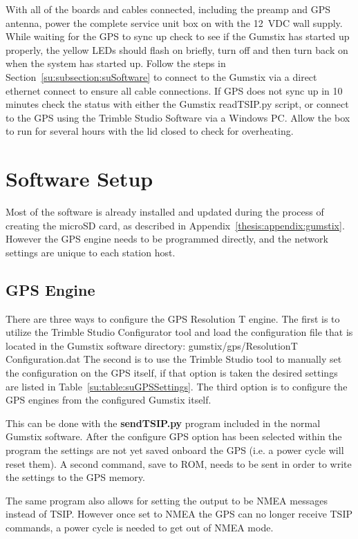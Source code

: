 With all of the boards and cables connected, including the preamp and GPS antenna, power the complete service unit box on with the 12~VDC wall supply.
While waiting for the GPS to sync up check to see if the Gumstix has started up properly, the yellow LEDs should flash on briefly, turn off and then turn back on when the system has started up.
Follow the steps in Section~\ref{su:subsection:suSoftware} to connect to the Gumstix via a direct ethernet connect to ensure all cable connections.
If GPS does not sync up in 10 minutes check the status with either the Gumstix readTSIP.py script, or connect to the GPS using the Trimble Studio Software via a Windows PC.
Allow the box to run for several hours with the lid closed to check for overheating.

\section{Software Setup}

Most of the software is already installed and updated during the process of creating the microSD card, as described in Appendix~\ref{thesis:appendix:gumstix}.
However the GPS engine needs to be programmed directly, and the network settings are unique to each station host.

\subsection{GPS Engine}

There are three ways to configure the GPS Resolution T engine.
The first is to utilize the Trimble Studio Configurator tool and load the configuration file that is located in the Gumstix software directory: gumstix/gps/ResolutionT Configuration.dat
The second is to use the Trimble Studio tool to manually set the configuration on the GPS itself, if that option is taken the desired settings are listed in Table~\ref{su:table:suGPSSettings}.
The third option is to configure the GPS engines from the configured Gumstix itself.

This can be done with the {\bf sendTSIP.py} program included in the normal Gumstix software.
After the configure GPS option has been selected within the program the settings are not yet saved onboard the GPS (i.e. a power cycle will reset them).
A second command, save to ROM, needs to be sent in order to write the settings to the GPS memory.

The same program also allows for setting the output to be NMEA messages instead of TSIP.
However once set to NMEA the GPS can no longer receive TSIP commands, a power cycle is needed to get out of NMEA mode.

